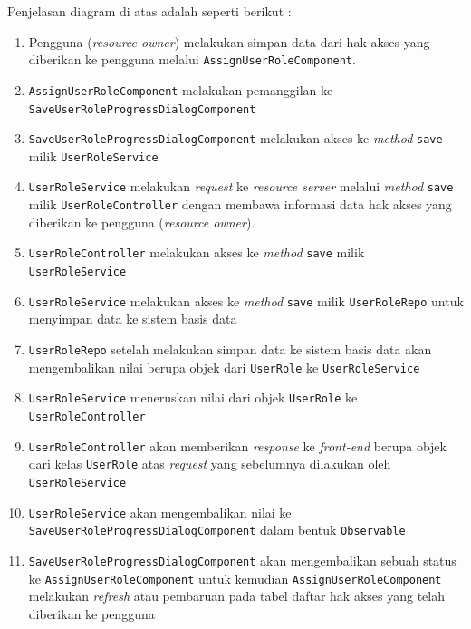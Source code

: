 \documentclass[pdftex,12pt, oneside]{article}
\begin{document}
\begin{itemize}
	Penjelasan diagram di atas adalah seperti berikut :
	
	\begin{enumerate}
		\item Pengguna (\textit{resource owner}) melakukan simpan data dari hak akses yang diberikan ke pengguna melalui \texttt{AssignUserRoleComponent}.
		
		\item \texttt{AssignUserRoleComponent} melakukan pemanggilan ke \texttt{SaveUserRoleProgressDialogComponent}
		
		\item \texttt{SaveUserRoleProgressDialogComponent} melakukan akses ke \textit{method} \texttt{save} milik \texttt{UserRoleService}
		
		\item \texttt{UserRoleService} melakukan \textit{request} ke \textit{resource server} melalui \textit{method} \texttt{save} milik \texttt{UserRoleController} dengan membawa informasi data hak akses yang diberikan ke pengguna (\textit{resource owner}).
		
		\item \texttt{UserRoleController} melakukan akses ke \textit{method} \texttt{save} milik \texttt{UserRoleService}
		
		\item \texttt{UserRoleService} melakukan akses ke \textit{method} \texttt{save} milik \texttt{UserRoleRepo} untuk menyimpan data ke sistem basis data
		
		\item \texttt{UserRoleRepo} setelah melakukan simpan data ke sistem basis data akan mengembalikan nilai berupa objek dari \texttt{UserRole} ke \texttt{UserRoleService}
		
		\item \texttt{UserRoleService} meneruskan nilai dari objek \texttt{UserRole} ke \texttt{UserRoleController}
		
		\item \texttt{UserRoleController} akan memberikan \textit{response} ke \textit{front-end} berupa objek dari kelas \texttt{UserRole} atas \textit{request} yang sebelumnya dilakukan oleh \texttt{UserRoleService}
		
		\item \texttt{UserRoleService} akan mengembalikan nilai ke \texttt{SaveUserRoleProgressDialogComponent} dalam bentuk \texttt{Observable}
		
		\item \texttt{SaveUserRoleProgressDialogComponent} akan mengembalikan sebuah status ke \texttt{AssignUserRoleComponent} untuk kemudian \texttt{AssignUserRoleComponent} melakukan \textit{refresh} atau pembaruan pada tabel daftar hak akses yang telah diberikan ke pengguna
	\end{enumerate}
	

\end{itemize}
\end{document}
